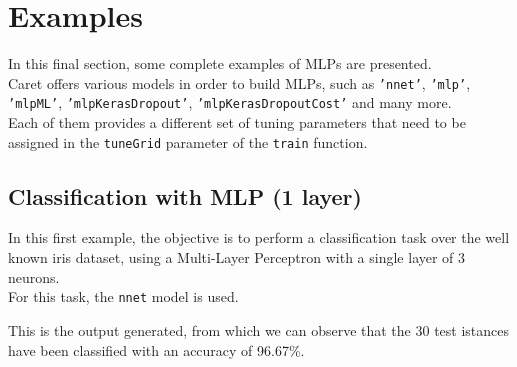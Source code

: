 \documentclass{article}
\begin{document}
\pagebreak

\section{Examples}
In this final section, some complete examples of MLPs are presented.\\
Caret offers various models in order to build MLPs, such as \texttt{'nnet'}, \texttt{'mlp'}, \texttt{'mlpML'}, \texttt{'mlpKerasDropout'}, \texttt{'mlpKerasDropoutCost'} and many more.\\

Each of them provides a different set of tuning parameters that need to be assigned in the \texttt{tuneGrid} parameter of the \texttt{train} function.\\

\subsection{Classification with MLP (1 layer)}
In this first example, the objective is to perform a classification task over the well known iris dataset, using a Multi-Layer Perceptron with a single layer of 3 neurons.\\
For this task, the \texttt{nnet} model is used.\\



\pagebreak

This is the output generated, from which we can observe that the 30 test istances have been classified with an accuracy of 96.67\%.\\
\end{document}

